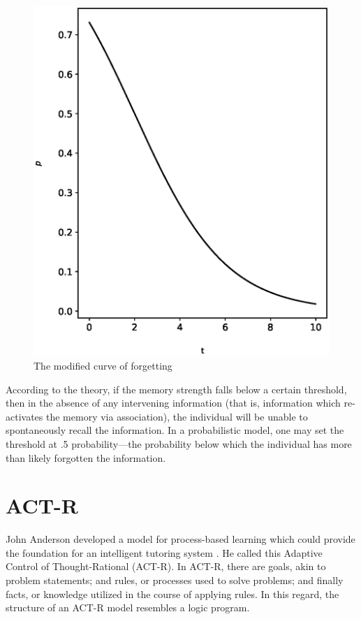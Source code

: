 \begin{figure}[p!]
 \label{fig:modified}
 \includegraphics{fig/modified.eps} 
 \caption{The modified curve of forgetting}
\end{figure}

According to the theory, if the memory strength falls below a certain
threshold, then in the absence of any intervening information (that is,
information which re-activates the memory via association), the individual will
be unable to spontaneously recall the information.  In a probabilistic model,
one may set the threshold at .5 probability---the probability below which the
individual has more than likely forgotten the information. 

\section{ACT-R}

John Anderson developed a model for process-based learning which could provide
the foundation for an intelligent tutoring system \cite{anderson}.  He called
this Adaptive Control of Thought-Rational (ACT-R).  In ACT-R, there are goals,
akin to problem statements; and rules, or processes used to solve problems; and
finally facts, or knowledge utilized in the course of applying rules.  In this
regard, the structure of an ACT-R model resembles a logic program.  

